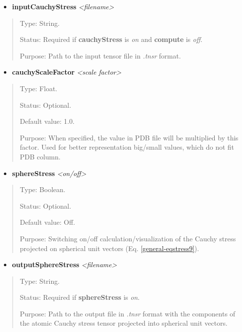 \documentclass[letterpaper,10pt,english]{sphinxmanual}
\begin{document}
\begin{itemize}
\item {} 
\textbf{inputCauchyStress} \emph{\textless{}filename\textgreater{}}

\end{itemize}
\begin{quote}

Type: String.

Status: Required if \textbf{cauchyStress} is \emph{on} and \textbf{compute} is \emph{off}.

Purpose:  Path to the input tensor file in \emph{.tnsr} format.
\end{quote}
\begin{itemize}
\item {} 
\textbf{cauchyScaleFactor} \emph{\textless{}scale factor\textgreater{}}

\end{itemize}
\begin{quote}

Type: Float.

Status: Optional.

Default value: 1.0.

Purpose: When specified, the value in PDB file will be multiplied by this factor. Used for better representation big/small values, which do not fit PDB column.
\end{quote}
\begin{itemize}
\item {} 
\textbf{sphereStress} \emph{\textless{}on/off\textgreater{}}

\end{itemize}
\begin{quote}

Type: Boolean.

Status: Optional.

Default value: Off.

Purpose: Switching on/off calculation/visualization of the Cauchy stress projected on spherical unit vectors (Eq. \eqref{general-eqstress9}).
\end{quote}
\begin{itemize}
\item {} 
\textbf{outputSphereStress} \emph{\textless{}filename\textgreater{}}

\end{itemize}
\begin{quote}

Type: String.

Status: Required if \textbf{sphereStress} is \emph{on}.

Purpose:  Path to the output file in \emph{.tnsr} format with the components of the atomic Cauchy stress tensor projected into spherical unit vectors.
\end{quote}
\end{document}

